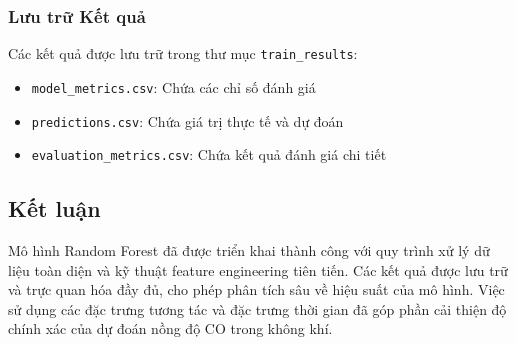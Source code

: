 \subsubsection{Lưu trữ Kết quả}
Các kết quả được lưu trữ trong thư mục \texttt{train\_results}:
\begin{itemize}
    \item \texttt{model\_metrics.csv}: Chứa các chỉ số đánh giá
    \item \texttt{predictions.csv}: Chứa giá trị thực tế và dự đoán
    \item \texttt{evaluation\_metrics.csv}: Chứa kết quả đánh giá chi tiết
\end{itemize}

\subsection{Kết luận}
Mô hình Random Forest đã được triển khai thành công với quy trình xử lý dữ liệu toàn diện và kỹ thuật feature engineering tiên tiến. Các kết quả được lưu trữ và trực quan hóa đầy đủ, cho phép phân tích sâu về hiệu suất của mô hình. Việc sử dụng các đặc trưng tương tác và đặc trưng thời gian đã góp phần cải thiện độ chính xác của dự đoán nồng độ CO trong không khí.